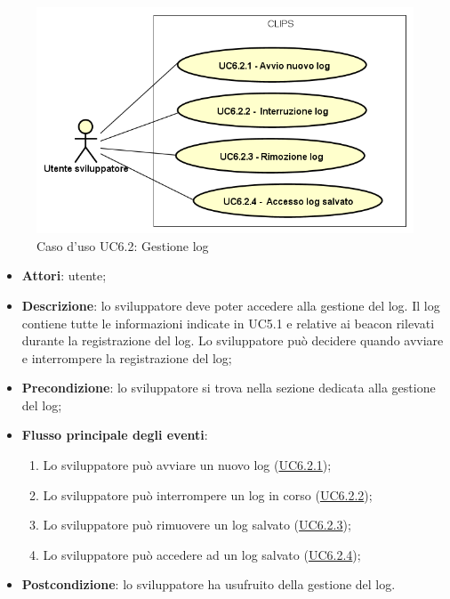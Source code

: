 \documentclass[../AnalisiDeiRequisiti.tex]{subfiles}
\begin{document}
        \begin{figure}[!h]
            \centering
            \includegraphics[scale=0.95, width=\textwidth]{img/UC6-2.png}
            \caption{Caso d'uso UC6.2: Gestione log}\label{fig:UC6.2} 
        \end{figure}
\begin{itemize}
\item \textbf{Attori}: utente;
\item \textbf{Descrizione}: lo sviluppatore deve poter accedere alla gestione del log. Il log contiene tutte le informazioni indicate in UC5.1 e relative ai beacon rilevati durante la registrazione del log. Lo sviluppatore può decidere quando avviare e interrompere la registrazione del log; 
      \item \textbf{Precondizione}: lo sviluppatore si trova nella sezione dedicata alla gestione del log;

        \item \textbf{Flusso principale degli eventi}:
          \begin{enumerate}
          \item Lo sviluppatore può avviare un nuovo log (\hyperlink{UC6.2.1}{UC6.2.1});
          \item Lo sviluppatore può interrompere un log in corso (\hyperlink{UC6.2.2}{UC6.2.2});
          \item Lo sviluppatore può rimuovere un log salvato (\hyperlink{UC6.2.3}{UC6.2.3});
          \item Lo sviluppatore può accedere ad un log salvato (\hyperlink{UC6.2.4}{UC6.2.4});

      \end{enumerate}
    \item \textbf{Postcondizione}: lo sviluppatore ha usufruito della gestione del log.
  \end{itemize}
\hypertarget{UC6.2.1}{}
\end{document}
